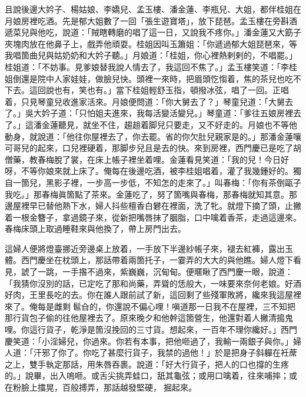 且說後邊大妗子、楊姑娘、李嬌兒、孟玉樓、潘金蓮、李瓶兒、大姐，都伴桂姐在月娘房裡吃酒。先是郁大姐數了一回「張生遊寶塔」，放下琵琶。孟玉樓在旁斟酒遞菜兒與他吃，說道：「賊瞎轉磨的唱了這一日，又說我不疼你。」潘金蓮又大筯子夾塊肉放在他鼻子上，戲弄他頑耍。桂姐因叫玉簫姐：「你遞過郁大姐琵琶來，等我唱箇曲兒與姑奶奶和大妗子聽。」月娘道：「桂姐，你心裡熱剌剌的，不唱罷。」桂姐道：「不妨事。見爹娘替我說人情去了，我這回不焦了。」孟玉樓笑道：「李桂姐倒還是院中人家娃娃，做臉兒快。頭裡一來時，把眉頭忔㥮着，焦的茶兒也吃不下去。{}這回說也有，笑也有。」當下桂姐輕舒玉指，頓撥冰弦，唱了一回。正唱着，只見琴童兒收進家活來。月娘便問道：「你大舅去了？」琴童兒道：「大舅去了。」吳大妗子道：「只怕姐夫進來，我每活變活變兒。」琴童道：「爹往五娘房裡去了。」這潘金蓮聽見，就坐不住，趨趄着脚兒只要走，又不好走的。{}月娘也不等他動身，就說道：「他往你屋裡去了，你去罷。省的你欠肚兒親家是的。」{}那潘金蓮嚷可哥兒的起來，口兒裡硬着，那脚步兒且是去的快。來到房裡，西門慶已是吃了胡僧藥，教春梅脫了裳，在床上帳子裡坐着哩。金蓮看見笑道：「我的兒！今日好呀，不等你娘來就上床了。俺每在後邊吃酒，被李桂姐唱着，灌了我幾鍾好的。獨自一箇兒，黑影子裡，一步高一步低，不知怎的走來了。」{}叫春梅：「你有茶倒甌子我吃。」那春梅眞箇點了茶來。金蓮吃了，努了箇嘴與春梅，那春梅就知其意。{}那邊屋裡早已替他熱下水，婦人抖些檀香白礬在裡面，{}洗了牝。就燈下摘了頭，止撇着一根金簪子，拿過鏡子來，從新把嘴唇抹了胭脂，口中噙着香茶，走過這邊來。春梅床頭上取過睡鞋來與他換了，帶上房門出去。

這婦人便將燈臺挪近旁邊桌上放着，一手放下半邊紗帳子來，褪去紅褲，露出玉體。西門慶坐在枕頭上，那話帶着兩箇托子，一霎弄的大大的與他瞧。婦人燈下看見，諕了一跳，一手揝不過來，紫巍巍，沉甸甸。便暱瞅了西門慶一眼，說道：「我猜你沒別的話，已定吃了那和尚藥，{}弄聳的恁般大，一味要來奈何老娘。好酒好肉，王里長吃的去。你在誰人跟前試了新，這回剩了些殘軍敗將，{}纔來我這屋裡來了。俺每是雌剩𩫻䯲㒲的，你還說不偏心哩！嗔道那一日我不在屋裡，三不知把那行貨包子偷的往他屋裡去了。原來晚夕和他幹這箇營生，他還對着人撇清搗鬼哩。你這行貨子，乾淨是箇沒挽回的三寸貨。想起來，一百年不理你纔好。」西門慶笑道：「小淫婦兒，你過來。你若有本事，把他咂過了，我輸一兩銀子與你。」婦人道：「汗邪了你了。你吃了甚麼行貨子，我禁的過他！」於是把身子斜軃在衽蓆之上，雙手執定那話，用朱唇吞裹。說道：「好大行貨子，把人的口也撐的生疼的。」說畢，出入嗚咂。或舌尖挑弄蛙口，舐其龜弦；或用口噙着，往來哺摔；或在粉臉上擂晃，百般搏弄，那話越發堅硬，𢳥掘起來。

